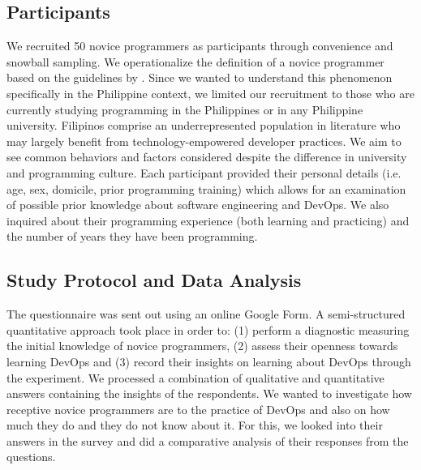 \documentclass{sigchi}
\begin{document}
\subsection{Participants}
We recruited 50 novice programmers as participants through convenience and snowball sampling. We operationalize the definition of a novice programmer based on the guidelines by \cite{teague2014longitudinal}. Since we wanted to understand this phenomenon specifically in the Philippine context, we limited our recruitment to those who are currently studying programming in the Philippines or in any Philippine university. Filipinos comprise an underrepresented population in literature who may largely benefit from technology-empowered developer practices. We aim to see common behaviors and factors considered despite the difference in university and programming culture. Each participant provided their personal details (i.e. age, sex, domicile, prior programming training) which allows for an examination of possible prior knowledge about software engineering and DevOps. We also inquired about their programming experience (both learning and practicing) and the number of years they have been programming. 
\subsection{Study Protocol and Data Analysis}
The questionnaire was sent out using an online Google Form. A semi-structured quantitative approach took place in order to: (1) perform a diagnostic measuring the initial knowledge of novice programmers, (2) assess their openness towards learning DevOps and (3) record their insights on learning about DevOps through the experiment. We processed a combination of qualitative and quantitative answers containing the insights of the respondents. We wanted to investigate how receptive novice programmers are to the practice of DevOps and also on how much they do and they do not know about it. For this, we looked into their answers in the survey and did a comparative analysis of their responses from the questions. 
\end{document}
